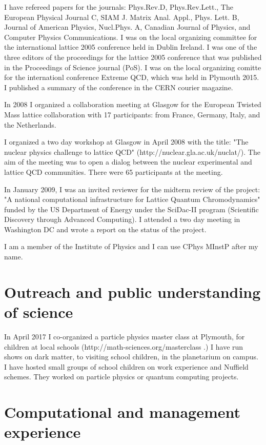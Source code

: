 \documentclass[12pt]{article}
\begin{document}
I have refereed papers for the journals: Phys.Rev.D, Phys.Rev.Lett.,
The European Physical Journal C, SIAM J. Matrix Anal. Appl.,
Phys. Lett. B, Journal of American Physics, Nucl.Phys. A, 
Canadian Journal of Physics,
and 
Computer Physics Communications.
I was on the local
organizing committee for the international lattice 2005 conference
held in Dublin Ireland. I was one of the three editors of the
proceedings for the lattice 2005 conference that was published in the
Proceedings of Science journal (PoS). I was on the local organizing
comitte for the internationl conference Extreme QCD, which was held
in Plymouth 2015. I published a summary of the conference in the CERN 
courier magazine.

In 2008 I organized a collaboration meeting at Glasgow for the
European Twisted Mass lattice collaboration with 17 participants: from
France, Germany, Italy, and the Netherlands.

I organized a two day workshop at Glasgow in April 2008 with the
title: "The nuclear physics challenge to lattice QCD"
(http://nuclear.gla.ac.uk/nuclat/). The aim of the meeting was to
open a dialog between the nuclear experimental and lattice
QCD communities. There were 65 participants at the meeting.

In January 2009, I was an invited reviewer for the midterm review of
the project: "A national computational infrastructure for Lattice
Quantum Chromodynamics" funded by the US Department of Energy 
under the SciDac-II program (Scientific Discovery 
through Advanced Computing).
I attended a two day meeting in Washington DC and wrote a report
on the status of the project.

I am a member of the Institute of Physics and I can use
CPhys MInstP after my name.

\section{Outreach and public understanding of science}

In April 2017 I co-organized a particle physics master 
class at Plymouth, for children at local schools  (http://math-sciences.org/masterclass .)
I have run shows on dark matter, to visiting school children,
in the planetarium on campus. I have hosted small groups
of school children on work experience and Nuffield 
schemes. They worked on particle physics or quantum computing
projects.


\section{Computational and management experience}
\end{document}
